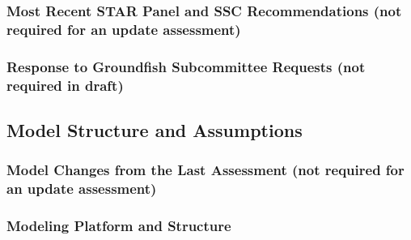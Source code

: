 \documentclass[11pt,
  english,
  a4paper,
]{article}
\begin{document}
\leavevmode\tagmcend\tagstructend


\hypertarget{most-recent-star-panel-and-ssc-recommendations-not-required-for-an-update-assessment}{%
\subsubsection{Most Recent STAR Panel and SSC Recommendations (not required for an update assessment)}\label{most-recent-star-panel-and-ssc-recommendations-not-required-for-an-update-assessment}}

\leavevmode\tagmcend\tagstructend


\hypertarget{response-to-groundfish-subcommittee-requests-not-required-in-draft}{%
\subsubsection{Response to Groundfish Subcommittee Requests (not required in draft)}\label{response-to-groundfish-subcommittee-requests-not-required-in-draft}}

\leavevmode\tagmcend\tagstructend


\hypertarget{model-structure-and-assumptions}{%
\subsection{Model Structure and Assumptions}\label{model-structure-and-assumptions}}

\leavevmode\tagmcend\tagstructend


\hypertarget{model-changes-from-the-last-assessment-not-required-for-an-update-assessment}{%
\subsubsection{Model Changes from the Last Assessment (not required for an update assessment)}\label{model-changes-from-the-last-assessment-not-required-for-an-update-assessment}}

\leavevmode\tagmcend\tagstructend


\hypertarget{modeling-platform-and-structure}{%
\subsubsection{Modeling Platform and Structure}\label{modeling-platform-and-structure}}
\end{document}
